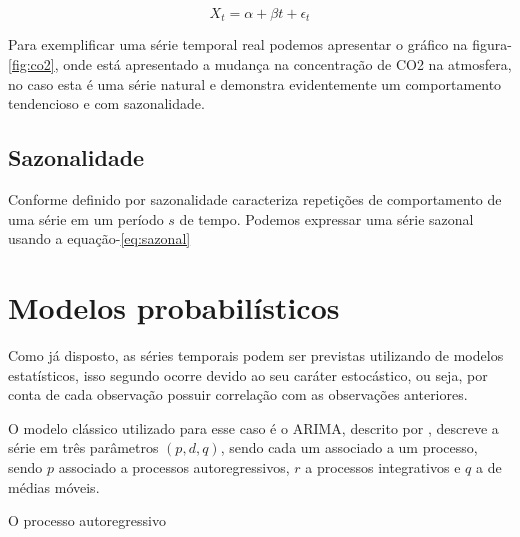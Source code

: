 \documentclass[
	12pt,
	oneside,
	a4paper,
	english,
	brazil
]{abntex2}
\begin{document}
\begin{equation}
	\label{eq:tendencia}
	X_t = \alpha + \beta{}t + \epsilon{}_t
\end{equation}

Para exemplificar uma série temporal real podemos apresentar o gráfico na 
figura-\ref{fig:co2}, onde está apresentado a mudança na concentração de CO2 na 
atmosfera, no caso esta é uma série natural e demonstra evidentemente um 
comportamento tendencioso e com sazonalidade.

\subsection{Sazonalidade}

Conforme definido por  sazonalidade caracteriza repetições de 
comportamento de uma série em um período $s$ de tempo. Podemos expressar uma 
série sazonal usando a equação-\ref{eq:sazonal}

\section{Modelos probabilísticos}

Como já disposto, as séries temporais podem ser previstas utilizando de modelos 
estatísticos, isso segundo  ocorre devido ao seu caráter 
estocástico, ou seja, por conta de cada observação possuir correlação com as 
observações anteriores.

O modelo clássico utilizado para esse caso é o ARIMA, descrito por 
, descreve a série em três parâmetros $(p,d,q)$, sendo cada um 
associado a um processo, sendo $p$ associado a processos autoregressivos, $r$ a 
processos integrativos e $q$ a de médias móveis.

O processo autoregressivo 

\postextual


\end{document}
